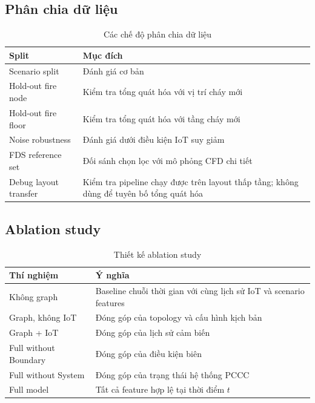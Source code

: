 \subsection{Phân chia dữ liệu}

\begin{table}[H]
\centering
\caption{Các chế độ phân chia dữ liệu}
\label{tab:splits}
\begin{tabularx}{\textwidth}{l X}
\toprule
\textbf{Split} & \textbf{Mục đích} \\
\midrule
Scenario split        & Đánh giá cơ bản \\
Hold-out fire node    & Kiểm tra tổng quát hóa với vị trí cháy mới \\
Hold-out fire floor   & Kiểm tra tổng quát hóa với tầng cháy mới \\
Noise robustness      & Đánh giá dưới điều kiện IoT suy giảm \\
FDS reference set     & Đối sánh chọn lọc với mô phỏng CFD chi tiết \\
Debug layout transfer & Kiểm tra pipeline chạy được trên layout thấp tầng; không dùng để tuyên bố tổng quát hóa \\
\bottomrule
\end{tabularx}
\end{table}

\subsection{Ablation study}

\begin{table}[H]
\centering
\caption{Thiết kế ablation study}
\label{tab:ablation}
\begin{tabularx}{\textwidth}{l X}
\toprule
\textbf{Thí nghiệm} & \textbf{Ý nghĩa} \\
\midrule
Không graph               & Baseline chuỗi thời gian với cùng lịch sử IoT và scenario features \\
Graph, không IoT          & Đóng góp của topology và cấu hình kịch bản \\
Graph + IoT               & Đóng góp của lịch sử cảm biến \\
Full without Boundary     & Đóng góp của điều kiện biên \\
Full without System       & Đóng góp của trạng thái hệ thống PCCC \\
Full model                & Tất cả feature hợp lệ tại thời điểm $t$ \\
\bottomrule
\end{tabularx}
\end{table}

